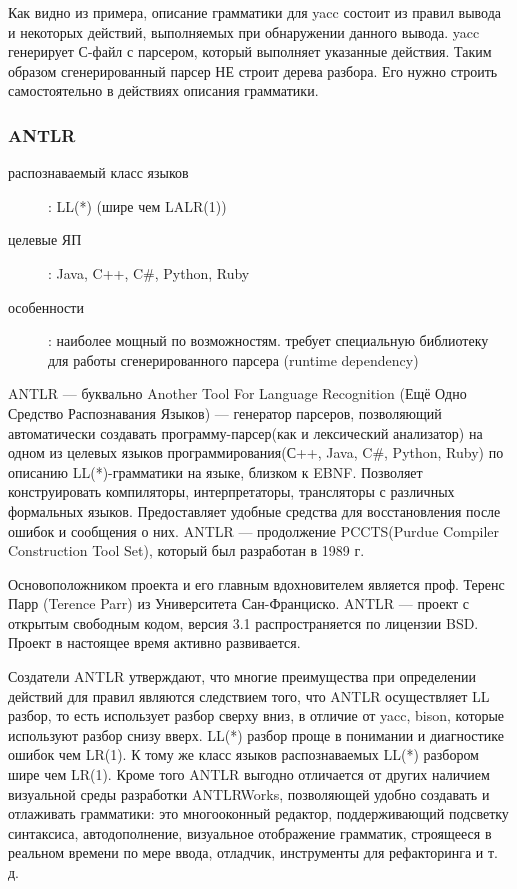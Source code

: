 \documentclass[a4paper,12pt]{article}
\begin{document}
Как видно из примера, описание грамматики для yacc состоит из правил вывода и
некоторых действий, выполняемых при обнаружении данного вывода.
yacc генерирует С-файл с парсером, который выполняет указанные действия.
Таким образом сгенерированный парсер НЕ строит дерева разбора. Его нужно строить
самостоятельно в действиях описания грамматики.

\subsubsection{ANTLR}
\begin{description}
  \item[распознаваемый класс языков]: LL(*) (шире чем LALR(1))
  \item[целевые ЯП]: Java, C++, C\#, Python, Ruby
  \item[особенности]: наиболее мощный по возможностям. требует специальную
  библиотеку для работы сгенерированного парсера (runtime dependency)
\end{description}
ANTLR — буквально Another Tool For Language Recognition (Ещё Одно Средство
Распознавания Языков) — генератор парсеров, позволяющий автоматически создавать
программу-парсер(как и лексический анализатор) на одном из целевых языков
программирования(С++, Java, C\#, Python, Ruby) по описанию LL(*)-грамматики на
языке, близком к EBNF. Позволяет конструировать компиляторы, интерпретаторы,
трансляторы с различных формальных языков. Предоставляет удобные средства для
восстановления после ошибок и сообщения о них. ANTLR — продолжение PCCTS(Purdue
Compiler Construction Tool Set), который был разработан в 1989 г.

Основоположником проекта и его главным вдохновителем является проф. Теренс Парр
(Terence Parr) из Университета Сан-Франциско. ANTLR — проект с открытым
свободным кодом, версия 3.1 распространяется по лицензии BSD. Проект в
настоящее время активно развивается.

Создатели ANTLR утверждают, что многие преимущества при определении действий
для правил являются следствием того, что ANTLR осуществляет LL разбор, то есть
использует разбор сверху вниз, в отличие от yacc, bison, которые
используют разбор снизу вверх. LL(*) разбор проще в понимании и
диагностике ошибок чем LR(1). К тому же класс языков распознаваемых LL(*)
разбором шире чем LR(1). Кроме того ANTLR выгодно отличается от других наличием
визуальной среды разработки ANTLRWorks, позволяющей удобно создавать и
отлаживать грамматики: это многооконный редактор, поддерживающий подсветку
синтаксиса, автодополнение, визуальное отображение грамматик, строящееся в
реальном времени по мере ввода, отладчик, инструменты для рефакторинга и т. д.
\end{document}
